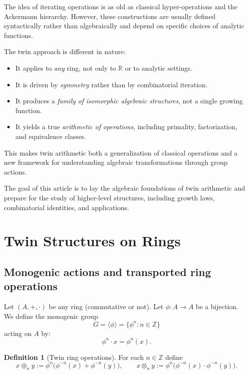 \documentclass[11pt]{article}
\theoremstyle{definition}
\newtheorem{definition}[theorem]{Definition}
\theoremstyle{remark}
\newcommand{\Z}{\mathbb{Z}}
\newcommand{\R}{\mathbb{R}}
\begin{document}
	The idea of iterating operations is as old as classical hyper-operations
	and the Ackermann hierarchy.  
	However, these constructions are usually defined syntactically rather
	than algebraically and depend on specific choices of analytic functions.
	
	The twin approach is different in nature:
	\begin{itemize}[leftmargin=2em]
		\item It applies to \emph{any} ring, not only to $\R$ or to analytic settings.
		\item It is driven by \emph{symmetry} rather than by combinatorial iteration.
		\item It produces a \emph{family of isomorphic algebraic structures}, not a
		single growing function.
		\item It yields a true \emph{arithmetic of operations}, including primality,
		factorization, and equivalence classes.
	\end{itemize}
	
	This makes twin arithmetic both a generalization of classical operations 
	and a new framework for understanding algebraic transformations through 
	group actions.
	
	\vspace{1em}
	
	The goal of this article is to lay the algebraic foundations of
	twin arithmetic and prepare for the study of higher-level structures,
	including growth laws, combinatorial identities, and applications.
	
	\section{Twin Structures on Rings}
	\label{sec:2}
	
	\subsection{Monogenic actions and transported ring operations}
	
	Let $(A,+,\cdot)$ be any ring (commutative or not).
	Let $\phi:A\to A$ be a bijection.
	We define the monogenic group
	\[
	G=\langle \phi\rangle=\{\phi^n : n\in\Z\}
	\]
	acting on $A$ by:
	\[
	\phi^n\cdot x = \phi^n(x).
	\]
	
	\begin{definition}[Twin ring operations]
		For each $n\in\Z$ define
		\[
		x\oplus_n y := \phi^n\bigl(\phi^{-n}(x)+\phi^{-n}(y)\bigr),
		\qquad
		x\otimes_n y := \phi^n\bigl(\phi^{-n}(x)\cdot\phi^{-n}(y)\bigr).
		\]
	\end{definition}
	
\end{document}
